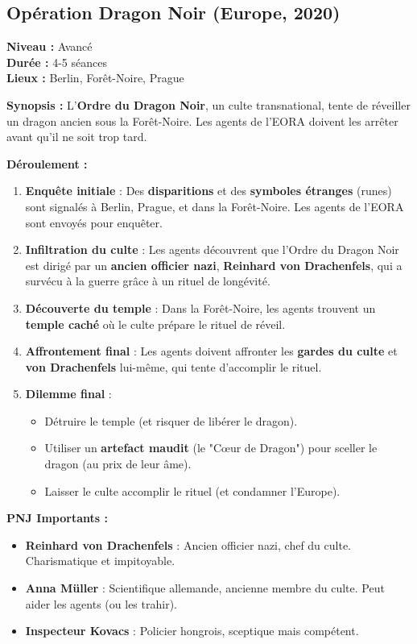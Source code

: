 \documentclass[10pt,a5paper,twoside]{book}
\begin{document}
\subsection{Opération Dragon Noir (Europe, 2020)}
\begin{shaded}
\textbf{Niveau :} Avancé \\ \textbf{Durée :} 4-5 séances \\ \textbf{Lieux :} Berlin, Forêt-Noire, Prague

\textbf{Synopsis :}
L'\textbf{Ordre du Dragon Noir}, un culte transnational, tente de réveiller un dragon ancien sous la Forêt-Noire. Les agents de l'EORA doivent les arrêter avant qu'il ne soit trop tard.

\textbf{Déroulement :}
\begin{enumerate}
	\item \textbf{Enquête initiale} : Des \textbf{disparitions} et des \textbf{symboles étranges} (runes) sont signalés à Berlin, Prague, et dans la Forêt-Noire. Les agents de l'EORA sont envoyés pour enquêter.
	\item \textbf{Infiltration du culte} : Les agents découvrent que l'Ordre du Dragon Noir est dirigé par un \textbf{ancien officier nazi}, \textbf{Reinhard von Drachenfels}, qui a survécu à la guerre grâce à un rituel de longévité.
	\item \textbf{Découverte du temple} : Dans la Forêt-Noire, les agents trouvent un \textbf{temple caché} où le culte prépare le rituel de réveil.
	\item \textbf{Affrontement final} : Les agents doivent affronter les \textbf{gardes du culte} et \textbf{von Drachenfels} lui-même, qui tente d'accomplir le rituel.
	\item \textbf{Dilemme final} :
	\begin{itemize}
		\item Détruire le temple (et risquer de libérer le dragon).
		\item Utiliser un \textbf{artefact maudit} (le "C\oe ur de Dragon") pour sceller le dragon (au prix de leur âme).
		\item Laisser le culte accomplir le rituel (et condamner l'Europe).
	\end{itemize}
\end{enumerate}

\textbf{PNJ Importants :}
	\begin{itemize}
		\item \textbf{Reinhard von Drachenfels} : Ancien officier nazi, chef du culte. Charismatique et impitoyable.
		\item \textbf{Anna Müller} : Scientifique allemande, ancienne membre du culte. Peut aider les agents (ou les trahir).
		\item \textbf{Inspecteur Kovacs} : Policier hongrois, sceptique mais compétent.
	\end{itemize}


\end{shaded}
\end{document}
